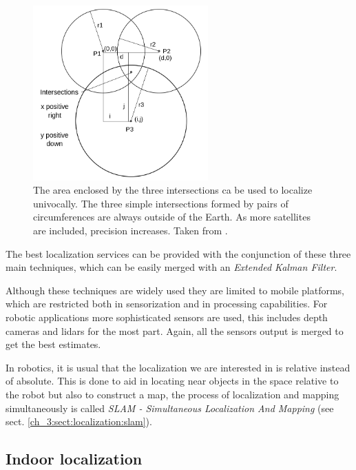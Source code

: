       \begin{figure}[!h]
        \centering
        \includegraphics[width=0.6\textwidth]{./Figures/trilateration.png}
        \caption{The area enclosed by the three intersections ca be used to localize univocally. The three simple intersections formed by pairs of circumferences are always outside of the Earth. As more satellites are included, precision increases. Taken from \cite{wikipedia_trilateration_web}.}
        \label{ch_3:fig:trilateration}
      \end{figure}

      The best localization services can be provided with the conjunction of these three main techniques, which can be easily merged with an \textit{Extended Kalman Filter}.

      Although these techniques are widely used they are limited to mobile platforms, which are restricted both in sensorization and in processing capabilities. For robotic applications more sophisticated sensors are used, this includes depth cameras and lidars for the most part. Again, all the sensors output is merged to get the best estimates.

      In robotics, it is usual that the localization we are interested in is relative instead of absolute. This is done to aid in locating near objects in the space relative to the robot but also to construct a map, the process of localization and mapping simultaneously is called \textit{SLAM - Simultaneous Localization And Mapping} (see sect. \ref{ch_3:sect:localization:slam}).

    \subsection{Indoor localization} \label{ch_3:sect:localization:indoor}

